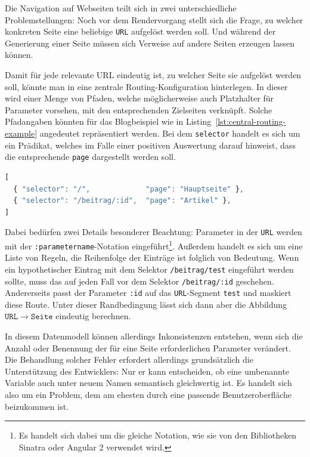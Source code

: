 Die Navigation auf Webseiten teilt sich in zwei unterschiedliche Problemstellungen: Noch vor dem Rendervorgang stellt sich die Frage, zu welcher konkreten Seite eine beliebige \texttt{URL} aufgelöst werden soll. Und während der Generierung einer Seite müssen sich Verweise auf andere Seiten erzeugen lassen können.

Damit für jede relevante URL eindeutig ist, zu welcher Seite sie aufgelöst werden soll, könnte man in \idename{} eine zentrale Routing-Konfiguration hinterlegen. In dieser wird einer Menge von Pfaden, welche möglicherweise auch Platzhalter für Parameter vorsehen, mit den entsprechenden Zielseiten verknüpft. Solche Pfadangaben könnten für das Blogbeispiel wie in Listing~\ref{lst:central-routing-example} angedeutet repräsentiert werden. Bei dem \texttt{selector} handelt es sich um ein Prädikat, welches im Falle einer positiven Auswertung darauf hinweist, dass die entsprechende \texttt{page} dargestellt werden soll.

\begin{lstlisting}[float=h!, language=JavaScript, caption={Zentrales Routing für das Blog-Beispiel}, label={lst:central-routing-example}]
[
  { "selector": "/",             "page": "Hauptseite" },
  { "selector": "/beitrag/:id",  "page": "Artikel" },
]
\end{lstlisting}

Dabei bedürfen zwei Details besonderer Beachtung: Parameter in der \texttt{URL} werden mit der  \texttt{:parametername}-Notation eingeführt\footnote{Es handelt sich dabei um die gleiche Notation, wie sie von den Bibliotheken Sinatra oder Angular 2 verwendet wird.}. Außerdem handelt es sich um eine Liste von Regeln, die Reihenfolge der Einträge ist folglich von Bedeutung. Wenn ein hypothetischer Eintrag mit dem Selektor \texttt{/beitrag/test} eingeführt werden sollte, muss das auf jeden Fall vor dem Selektor \texttt{/beitrag/:id} geschehen. Andererseits passt der Parameter \texttt{:id} auf das \texttt{URL}-Segment \texttt{test} und maskiert diese Route. Unter dieser Randbedingung lässt sich dann aber die Abbildung $\mathtt{URL} \rightarrow \mathtt{Seite}$ eindeutig berechnen.

In diesem Datenmodell können allerdings Inkonsistenzen entstehen, wenn sich die Anzahl oder Benennung der für eine Seite erforderlichen Parameter verändert. Die Behandlung solcher Fehler erfordert allerdings grundsätzlich die Unterstützung des Entwicklers: Nur er kann entscheiden, ob eine umbenannte Variable auch unter neuem Namen semantisch gleichwertig ist. Es handelt sich also um ein Problem, dem am ehesten durch eine passende Benutzeroberfläche beizukommen ist.

